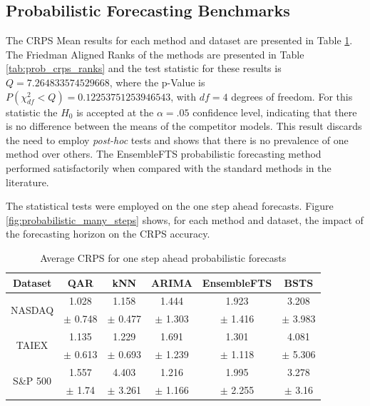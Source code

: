 %
\subsection{Probabilistic Forecasting Benchmarks}
\label{sec:prob_experiments_probabilistic}

The CRPS Mean results for each method and dataset are presented in Table \ref{tab:prob_crps_results}. The Friedman Aligned Ranks of the methods are presented in Table \ref{tab:prob_crps_ranks} and the test statistic for these results is $Q = 7.264833574529668$, where the p-Value is $P(\chi ^2_{df} < Q) = 0.12253751253946543$, with $df=4$ degrees of freedom. For this statistic the $H_0$ is accepted at the $\alpha = .05$ confidence level, indicating that there is no difference between the means of the competitor models. This result discards the need to employ \textit{post-hoc} tests and shows that there is no prevalence of one method over others. The EnsembleFTS probabilistic forecasting method performed satisfactorily when compared with the standard methods in the literature. 

The statistical tests were employed on the one step ahead forecasts. Figure \ref{fig:probabilistic_many_steps} shows, for each method and dataset, the impact of the forecasting horizon on the CRPS accuracy.

\begin{table}[htp]
    \centering
    \begin{tabular}{|c|ccccc|}
\hline
\textbf{ Dataset } & \textbf{ QAR } & \textbf{ kNN } & \textbf{ ARIMA } & \textbf{ EnsembleFTS } & \textbf{ BSTS } \\
\hline
\multirow{2}{*}{NASDAQ} &    1.028 &    1.158 &    1.444 &       1.923 &    3.208 \\
&  $\pm$ 0.748 &  $\pm$  0.477 &  $\pm$  1.303 &     $\pm$  1.416 &  $\pm$  3.983 \\ \hline
\multirow{2}{*}{TAIEX} &    1.135 &    1.229 &    1.691 &       1.301 &    4.081 \\
 &  $\pm$  0.613 &  $\pm$  0.693 &  $\pm$  1.239 &     $\pm$  1.118 &  $\pm$  5.306 \\ \hline
\multirow{2}{*}{S\&P 500} &    1.557 &    4.403 &    1.216 &       1.995 &    3.278 \\
&   $\pm$  1.74 &  $\pm$  3.261 &  $\pm$  1.166 &     $\pm$  2.255 &   $\pm$  3.16 \\ \hline
\end{tabular}
    \caption{Average CRPS for one step ahead probabilistic forecasts}
    \label{tab:prob_crps_results}
\end{table}

